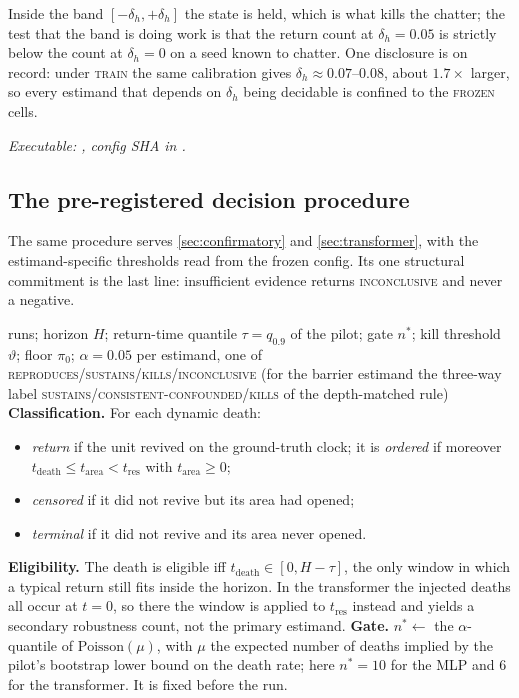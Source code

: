 \documentclass[11pt]{article}
\theoremstyle{definition}
\theoremstyle{remark}
\begin{document}
\noindent Inside the band $[-\delta_h,+\delta_h]$ the state is held, which is
what kills the chatter; the test that the band is doing work is that the return
count at $\delta_h=0.05$ is strictly below the count at $\delta_h=0$ on a seed
known to chatter. One disclosure is on record: under \textsc{train} the same
calibration gives $\delta_h\approx0.07$--$0.08$, about $1.7\times$ larger, so
every estimand that depends on $\delta_h$ being decidable is confined to the
\textsc{frozen} cells.

{\sloppy\noindent\textit{Executable: ,
config SHA in .}\par}

\subsection{The pre-registered decision procedure}\label{app:alg4}

The same procedure serves \cref{sec:confirmatory} and \cref{sec:transformer},
with the estimand-specific thresholds read from the frozen config. Its one
structural commitment is the last line: insufficient evidence returns
\textsc{inconclusive} and never a negative.

\begin{algorithm}[t]
\caption{Pre-registered decision procedure (part 1 of 2): classification,
eligibility and gate.}
\label{alg:decisao}
\begin{algorithmic}[1]
\REQUIRE runs; horizon $H$; return-time quantile $\tau=q_{0.9}$ of the pilot;
gate $n^\ast$; kill threshold $\vartheta$; floor $\pi_0$; $\alpha=0.05$
\ENSURE per estimand, one of
\textsc{reproduces}/\textsc{sustains}/\textsc{kills}/\textsc{inconclusive}
(for the barrier estimand the three-way label
\textsc{sustains}/\textsc{consistent-confounded}/\textsc{kills} of the
depth-matched rule)
\STATE \textbf{Classification.} For each dynamic death:
\begin{itemize}\itemsep0pt
\item \emph{return} if the unit revived on the ground-truth clock; it is
\emph{ordered} if moreover $t_{\mathrm{death}}\le t_{\mathrm{area}}<t_{\mathrm{res}}$
with $t_{\mathrm{area}}\ge0$;
\item \emph{censored} if it did not revive but its area had opened;
\item \emph{terminal} if it did not revive and its area never opened.
\end{itemize}
\STATE \textbf{Eligibility.} The death is eligible iff
$t_{\mathrm{death}}\in[0,H-\tau]$, the only window in which a typical return
still fits inside the horizon. In the transformer the injected deaths all occur
at $t=0$, so there the window is applied to $t_{\mathrm{res}}$ instead and yields
a secondary robustness count, not the primary estimand.
\STATE \textbf{Gate.} $n^\ast\leftarrow$ the $\alpha$-quantile of
$\mathrm{Poisson}(\mu)$, with $\mu$ the expected number of deaths implied by the
pilot's bootstrap lower bound on the death rate; here $n^\ast=10$ for the MLP and
$6$ for the transformer. It is fixed before the run.
\end{algorithmic}
\end{algorithm}
\end{document}
